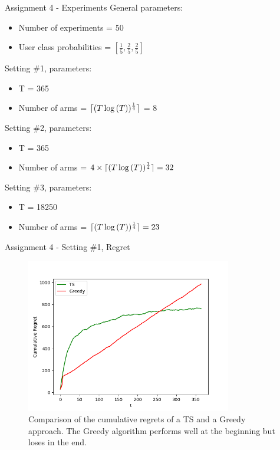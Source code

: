 \documentclass[11pt]{beamer}
\DeclarePairedDelimiter{\ceil}{\lceil}{\rceil}
\begin{document}
\begin{frame}{Assignment 4 - Experiments}
General parameters:
\begin{itemize}
\item Number of experiments = 50
\item User class probabilities = $[\frac{1}{5}, \frac{2}{5}, \frac{2}{5}]$
\end{itemize} 
Setting \#1, parameters:
\begin{itemize}
\item T = 365
\item Number of arms = $\ceil{(T \log{(T)})^{\frac{1}{4}}}$ = 8
\end{itemize}
Setting \#2, parameters:
\begin{itemize}
\item T = 365
\item Number of arms = $4 \times \ceil{(T \log{(T)})^{\frac{1}{4}}} = 32$
\end{itemize}
Setting \#3, parameters:
\begin{itemize}
\item T = 18250
\item Number of arms = $\ceil{(T \log{(T)})^{\frac{1}{4}}} = 23$
\end{itemize}
\end{frame}

\begin{frame}{Assignment 4 - Setting \#1, Regret}
\begin{figure}[hbtp]
\centering
\includegraphics[width=0.8\textwidth]{images/assignment_4_exp_1_cum_regret.png}
\caption{Comparison of the cumulative regrets of a TS and a Greedy approach. The Greedy algorithm performs well at the beginning but loses in the end.}
\end{figure}
\end{frame}
\end{document}

